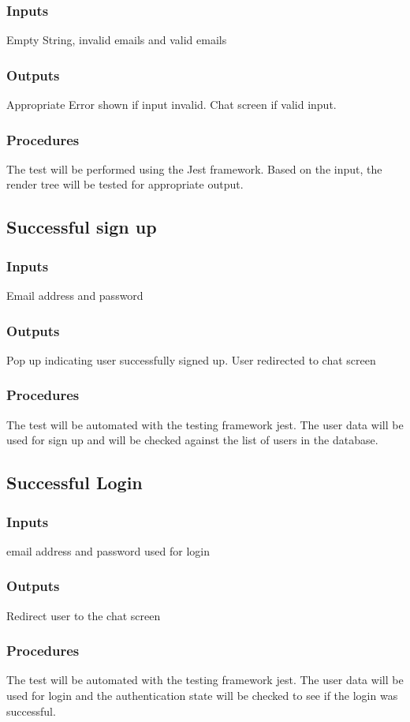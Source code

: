 \documentclass[12pt, titlepage]{article}
\begin{document}
\subsubsection{Inputs}
Empty String, invalid emails and valid emails 
\subsubsection{Outputs}
Appropriate Error shown if input invalid. Chat screen if valid input.
\subsubsection{Procedures}
The test will be performed using the Jest framework. Based on the input, the render tree will be tested for appropriate output.
\subsection{Successful sign up}
\subsubsection{Inputs}
Email address and password
\subsubsection{Outputs}
Pop up indicating user successfully signed up. User redirected to chat screen
\subsubsection{Procedures}
The test will be automated with the testing framework jest. The user data will be used for sign up and will be checked against the list of users in the database.
\subsection{Successful Login}
\subsubsection{Inputs}
email address and password used for login
\subsubsection{Outputs}
Redirect user to the chat screen
\subsubsection{Procedures}
The test will be automated with the testing framework jest. The user data will be used for login and the authentication state will be checked to see if the login was successful.
\end{document}
